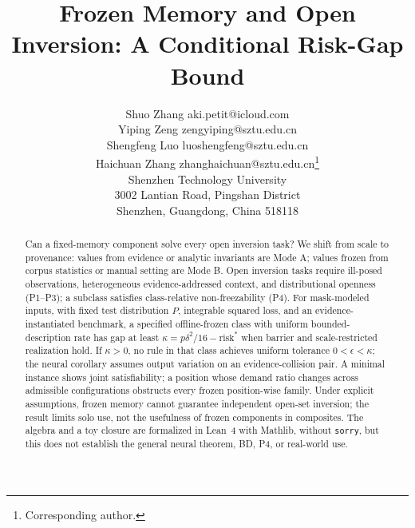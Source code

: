 \documentclass[twoside,11pt]{article}
\begin{document}
\title{Frozen Memory and Open Inversion: A Conditional Risk-Gap Bound}

\author{\name Shuo Zhang \email aki.petit@icloud.com \\ %
       \name Yiping Zeng \email zengyiping@sztu.edu.cn \\
       \name Shengfeng Luo \email luoshengfeng@sztu.edu.cn \\
       \name Haichuan Zhang \email zhanghaichuan@sztu.edu.cn\thanks{Corresponding author.} \\[2pt]
       \addr Shenzhen Technology University\\ %
       3002 Lantian Road, Pingshan District\\
       Shenzhen, Guangdong, China 518118}


\maketitle

\begin{abstract}
Can a fixed-memory component solve every open inversion task? We shift from scale to provenance: values from evidence or analytic invariants are Mode A; values frozen from corpus statistics or manual setting are Mode B. Open inversion tasks require ill-posed observations, heterogeneous evidence-addressed context, and distributional openness (P1--P3); a subclass satisfies class-relative non-freezability (P4). For mask-modeled inputs, with fixed test distribution $P$, integrable squared loss, and an evidence-instantiated benchmark, a specified offline-frozen class with uniform bounded-description rate has gap at least $\kappa=p\delta^2/16-\mathrm{risk}^*$ when barrier and scale-restricted realization hold. If $\kappa>0$, no rule in that class achieves uniform tolerance $0<\epsilon<\kappa$; the neural corollary assumes output variation on an evidence-collision pair. A minimal instance shows joint satisfiability; a position whose demand ratio changes across admissible configurations obstructs every frozen position-wise family. Under explicit assumptions, frozen memory cannot guarantee independent open-set inversion; the result limits solo use, not the usefulness of frozen components in composites. The algebra and a toy closure are formalized in Lean~4 with Mathlib, without \texttt{sorry}, but this does not establish the general neural theorem, BD, P4, or real-world use.
\end{abstract}
\end{document}
